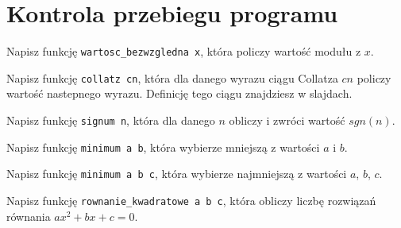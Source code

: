 \section{Kontrola przebiegu programu}
\begin{questions}
  \item {
    Napisz funkcję \texttt{wartosc\_bezwzgledna x}, która policzy wartość
    modułu z $x$.
  }
  \item {
    Napisz funkcję \texttt{collatz cn}, która dla danego wyrazu ciągu Collatza
    $cn$ policzy wartość nastepnego wyrazu. Definicję tego ciągu znajdziesz
    w slajdach.
  }
  \item {
    Napisz funkcję \texttt{signum n}, która dla danego $n$ obliczy i zwróci
    wartość $sgn(n)$.
  }
  \item {
    Napisz funkcję \texttt{minimum a b}, która wybierze mniejszą z wartości
    $a$ i $b$.
  }
  \item {
    Napisz funkcję \texttt{minimum a b c}, która wybierze najmniejszą z wartości
    $a$, $b$, $c$.
  }
  \item {
    Napisz funkcję \texttt{rownanie\_kwadratowe a b c}, która obliczy liczbę
    rozwiązań równania $ax^2 + bx + c = 0$.
  }
\end{questions}
